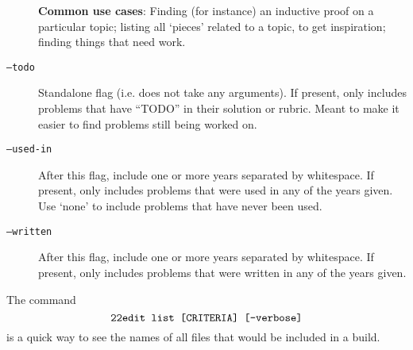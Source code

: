 \begin{description}
        \textbf{Common use cases}: Finding (for instance) an inductive proof 
        on a particular topic; listing all `pieces' related to a topic, to get
        inspiration; finding things that need work.
      \item[\texttt{--todo}] 
        Standalone flag (i.e. does not take any arguments). If present, only 
        includes problems that have ``TODO'' in their 
        solution or rubric. Meant to make it easier to find problems still 
        being worked on.
      \item[\texttt{--used-in}] 
        After this flag, include one or more years separated by whitespace.
        If present, only includes problems that were used in any of the years 
        given. Use `none' to include problems that have never been used. 
      \item[\texttt{--written}] 
        After this flag, include one or more years separated by whitespace. 
        If present, only includes problems that were written in any of the 
        years given.
    \end{description}
    
  The command \[\texttt{\texttt{22edit }list [CRITERIA] [--verbose]}\] is a quick way to
  see the names of all files that would be included in a build.
